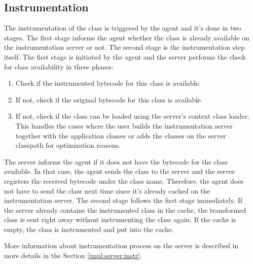 \subsection{Instrumentation}
The instrumentation of the class is triggered by the agent and it's done in two stages. The first stage informs the agent whether the class is already available on the instrumentation server or not. The second stage is the instrumentation step itself. The first stage is initiated by the agent and the server performs the check for class availability in three phases:
\begin{enumerate}
	\item Check if the instrumented bytecode for this class is available.
	\item If not, check if the original bytecode for this class is available.
	\item If not, check if the class can be loaded using the server's context class loader. This handles the cases where the user builds the instrumentation server together with the application classes or adds the classes on the server classpath for optimization reasons.
\end{enumerate}

The server informs the agent if it does not have the bytecode for the class available. In that case, the agent sends the class to the server and the server registers the received bytecode under the class name. Therefore, the agent does not have to send the class next time since it's already cached on the instrumentation server.
The second stage follows the first stage immediately. If the server already contains the instrumented class in the cache, the transformed class is sent right away without instrumenting the class again. If the cache is empty, the class is instrumented and put into the cache.

More information about instrumentation process on the server is described in more details in the Section \ref{impl:server:instr}.

